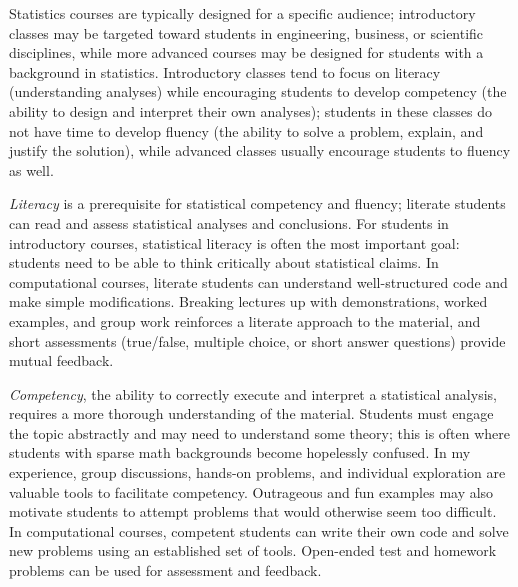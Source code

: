 \documentclass[10.25pt,letterpaper,sans,unicode]{moderncv}        %
\begin{document}

\vspace{.25cm}\hspace{8pt}
Statistics courses are typically designed for a specific audience; introductory classes may be targeted toward students in engineering, business, or scientific disciplines, while more advanced courses may be designed for students with a background in statistics. Introductory classes tend to focus on literacy (understanding analyses) while encouraging students to develop competency (the ability to design and interpret their own analyses); students in these classes do not have time to develop fluency (the ability to solve a problem, explain, and justify the solution), while advanced classes usually encourage students to fluency as well.

\textit{Literacy} is a prerequisite for statistical competency and fluency; literate students can read and assess statistical analyses and conclusions. For students in introductory courses, statistical literacy is often the most important goal: students need to be able to think critically about statistical claims. In computational courses, literate students can understand well-structured code and make simple modifications. Breaking lectures up with demonstrations, worked examples, and group work reinforces a literate approach to the material, and short assessments (true/false, multiple choice, or short answer questions) provide mutual feedback. 

\textit{Competency}, the ability to correctly execute and interpret a statistical analysis, requires a more thorough understanding of the material. Students must engage the topic abstractly and may need to understand some theory; this is often where students with sparse math backgrounds become hopelessly confused. In my experience, group discussions, hands-on problems, and individual exploration are valuable tools to facilitate competency. Outrageous and fun examples may also motivate students to attempt problems that would otherwise seem too difficult. In computational courses, competent students can write their own code and solve new problems using an established set of tools. Open-ended test and homework problems can be used for assessment and feedback. 
\end{document}
